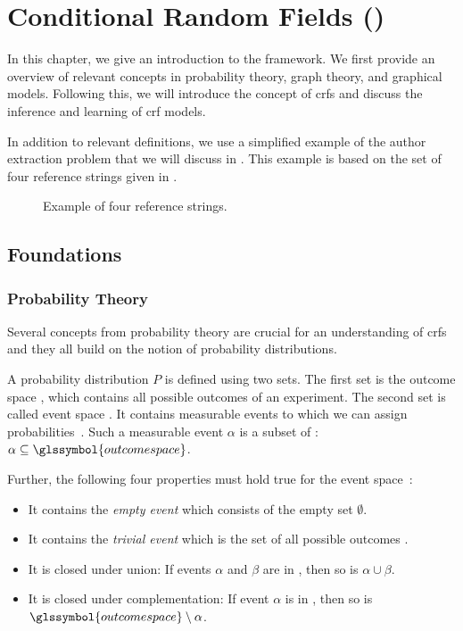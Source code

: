\chapter{Conditional Random Fields ()}\label{cha:crfs}

In this chapter, we give an introduction to the  framework.
We first provide an overview of relevant concepts in probability theory, graph theory, and graphical models.
Following this, we will introduce the concept of \glspl{crf} and discuss the inference and learning of \gls{crf} models.

In addition to relevant definitions, we use a simplified example of the author extraction problem that we will discuss in .
This example is based on the set of four reference strings given in .

\begin{figure}[t]
\begin{framed}
  
\end{framed}
\caption{Example of four reference strings.}
\label{fig:example-reference-strings}
\end{figure}
\section{Foundations}\label{sec:foundations}
\subsection{Probability Theory}\label{subsec:probability-theory}
Several concepts from probability theory are crucial for an understanding of \glspl{crf} and they all build on the notion of \glspl{probability distribution}.

A \gls{probability distribution} $P$ is defined using two sets.
The first set is the \gls{outcome space} , which contains all possible outcomes of an experiment.
The second set is called \gls{event space} .
It contains measurable \glspl{event} to which we can assign probabilities~\citep{koller2009probabilistic}.
Such a measurable \gls{event} $\alpha$ is a subset of : $\alpha\subseteq\glssymbol{outcome space}$.

Further, the following four properties must hold true for the \gls{event space}~\citep{koller2009probabilistic}:
\begin{itemize}
  \item It contains the \textit{empty event} which consists of the empty set $\emptyset$.
  \item It contains the \textit{trivial event} which is the set of all possible outcomes .
  \item It is closed under union: If \glspl{event} $\alpha$ and $\beta$ are in , then so is $\alpha\cup\beta$.
  \item It is closed under complementation: If \gls{event} $\alpha$ is in , then so is $\glssymbol{outcome space}\setminus\alpha$.
\end{itemize}

